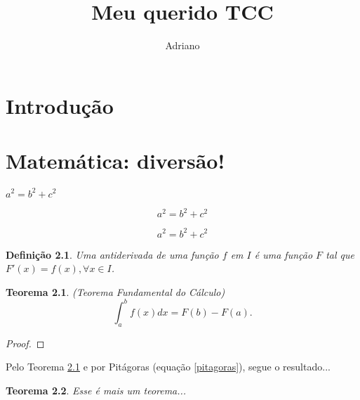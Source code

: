 \documentclass{abntex2}
\author{Adriano}
\title{Meu querido TCC}
\newtheorem{definicao}{Definição}[section]  %
\newtheorem{teorema}{Teorema}[chapter]  %
\begin{document}
\maketitle

\chapter{Introdução}
\lipsum[1-8]

\chapter{Matemática: diversão!}
$a^2=b^2+c^2$

$$a^2=b^2+c^2$$

\begin{equation}
	a^2=b^2+c^2
	\label{pitagoras}
\end{equation}

\begin{definicao}
	Uma antiderivada de uma função $f$ em $I$ é uma função $F$ tal que $F'(x)=f(x),\forall x\in I$.
\end{definicao}

\begin{teorema}(Teorema Fundamental do Cálculo)
	\[\int_a^b f(x) dx = F(b)-F(a).\]
	\label{tfc}
\end{teorema}
\begin{proof}
	\lipsum[1]
\end{proof}

Pelo Teorema \ref{tfc} e por Pitágoras (equação \ref{pitagoras}), segue o resultado... 

\begin{teorema}
	Esse é mais um teorema...
\end{teorema}
\end{document}
